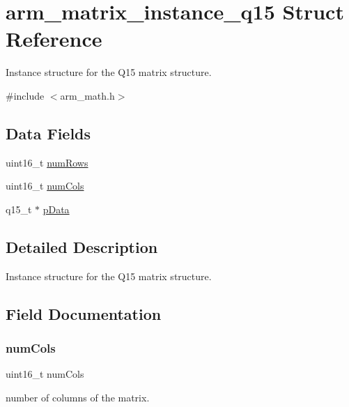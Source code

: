 \hypertarget{structarm__matrix__instance__q15}{}\section{arm\+\_\+matrix\+\_\+instance\+\_\+q15 Struct Reference}
\label{structarm__matrix__instance__q15}


Instance structure for the Q15 matrix structure.  




{\ttfamily \#include $<$arm\+\_\+math.\+h$>$}

\subsection*{Data Fields}
\begin{DoxyCompactItemize}
\item 
uint16\+\_\+t \mbox{\hyperlink{structarm__matrix__instance__q15_a1bcf80ccdc2acc29198f1592ae300390}{num\+Rows}}
\item 
uint16\+\_\+t \mbox{\hyperlink{structarm__matrix__instance__q15_a4bb5ec0d13eb4c9cf887aa8366a44117}{num\+Cols}}
\item 
q15\+\_\+t $\ast$ \mbox{\hyperlink{structarm__matrix__instance__q15_a817ede38365e63e561a12069c6c5c087}{p\+Data}}
\end{DoxyCompactItemize}


\subsection{Detailed Description}
Instance structure for the Q15 matrix structure. 

\subsection{Field Documentation}
\mbox{\label{structarm__matrix__instance__q15_a4bb5ec0d13eb4c9cf887aa8366a44117}} 
\subsubsection{\texorpdfstring{numCols}{numCols}}
{\footnotesize\ttfamily uint16\+\_\+t num\+Cols}

number of columns of the matrix. \mbox{\label{structarm__matrix__instance__q15_a1bcf80ccdc2acc29198f1592ae300390}} 
